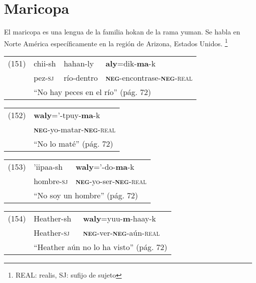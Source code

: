 \section*{Maricopa}

\noindent El maricopa es una lengua de la familia hokan de la rama yuman. Se habla en Norte América específicamente en la región de Arizona, Estados Unidos.
\footnote{REAL: realis, SJ: sufijo de sujeto}
\vspace{0.5cm}

{\setmainfont{Charis SIL} 

\begin{tabular}{llll}
(151) & chii-sh & hahan-ly & \textbf{aly}=dik-\textbf{ma}-k \\
& pez-\textsc{sj} & río-dentro & \textsc{\textbf{neg}}-encontrase-\textsc{\textbf{neg}-real}\\
& \multicolumn{3}{l}{``No hay peces en el río'' (pág. 72)}
\end{tabular} \vspace{0.5cm}

\begin{tabular}{ll}
(152) & \textbf{waly}='-tpuy-\textbf{ma}-k \\
& \textsc{\textbf{neg}}-yo-matar-\textsc{\textbf{neg}-real} \\
& ``No lo maté'' (pág. 72)
\end{tabular} \vspace{0.5cm}

\begin{tabular}{lll}
(153) & 'iipaa-sh & \textbf{waly}='-do-\textbf{ma}-k \\
& hombre-\textsc{sj} & \textsc{\textbf{neg}}-yo-ser-\textsc{\textbf{neg}-real} \\
& \multicolumn{2}{l}{``No soy un hombre'' (pág. 72)}
\end{tabular} \vspace{0.5cm}

\begin{tabular}{lll}
(154) & Heather-sh & \textbf{waly}=yuu-\textbf{m}-haay-k \\
& Heather-\textsc{sj} & \textsc{\textbf{neg}-}ver-\textsc{\textbf{neg}-}aún-\textsc{real} \\
& \multicolumn{2}{l}{``Heather aún no lo ha visto'' (pág. 72)}
\end{tabular} \vspace{0.5cm}

}

